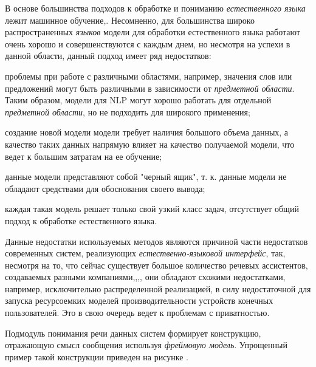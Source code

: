 {В основе большинства подходов к обработке и пониманию \textit{естественного языка} лежит машинное обучение,.
Несомненно, для большинства широко распространенных \textit{языков} модели для обработки естественного языка работают очень хорошо и совершенствуются с каждым днем, но несмотря на успехи в данной области, данный подход имеет ряд недостатков:
\begin{textitemize}
    \item проблемы при работе с различными областями, например, значения слов или предложений могут быть различными в зависимости от \textit{предметной области}.
    Таким образом, модели для NLP могут хорошо работать для отдельной \textit{предметной области}, но не подходить для широкого применения;
    \item создание новой модели модели требует наличия большого объема данных, а качество таких данных напрямую влияет на качество получаемой модели, что ведет к большим затратам на ее обучение;
    \item данные модели представляют собой "черный ящик"{}, т. к. данные модели не обладают средствами для обоснования своего вывода;
    \item каждая такая модель решает только свой узкий класс задач, отсутствует общий подход к обработке естественного языка.
\end{textitemize}

Данные недостатки используемых методов являются причиной части недостатков современных систем, реализующих \textit{естественно-языковой интерфейс}, так, несмотря на то, что сейчас существует большое количество речевых ассистентов, создаваемых разными компаниями,,,, они обладают схожими недостатками, например, исключительно распределенной реализацией, в силу недостаточной для запуска ресурсоемких моделей производительности устройств конечных пользователей.
Это в свою очередь ведет к проблемам с приватностью.

Подмодуль понимания речи данных систем формирует конструкцию, отражающую смысл сообщения используя \textit{фреймовую модель}.
Упрощенный пример такой конструкции приведен на рисунке \textit{}.

}
